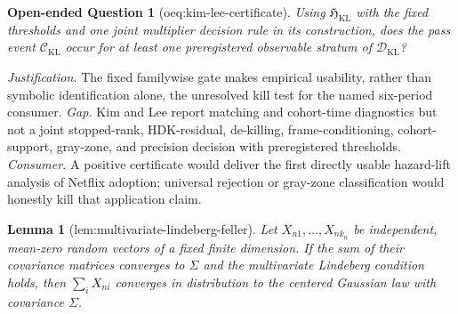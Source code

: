 \documentclass{article}
\newtheorem{lemma}{Lemma}
\newtheorem{openendedquestion}{Open-ended Question}
\begin{document}
\begin{openendedquestion}[oeq:kim-lee-certificate]\label{oeq:kim-lee-certificate}
Using \(\mathfrak H_{\mathrm{KL}}\) with the fixed thresholds and one joint multiplier decision rule in its construction, does the pass event \(\mathcal C_{\mathrm{KL}}\) occur for at least one preregistered observable stratum of \(\mathscr D_{\mathrm{KL}}\)?
\end{openendedquestion}
\par\smallskip\noindent \textit{Justification.} The fixed familywise gate makes empirical usability, rather than symbolic identification alone, the unresolved kill test for the named six-period consumer. \textit{Gap.} Kim and Lee report matching and cohort-time diagnostics but not a joint stopped-rank, HDK-residual, de-killing, frame-conditioning, cohort-support, gray-zone, and precision decision with preregistered thresholds. \textit{Consumer.} A positive certificate would deliver the first directly usable hazard-lift analysis of Netflix adoption; universal rejection or gray-zone classification would honestly kill that application claim.

\begin{lemma}[lem:multivariate-lindeberg-feller]\label{lem:multivariate-lindeberg-feller}
Let \(X_{n1},\ldots,X_{nk_n}\) be independent, mean-zero random vectors of a fixed finite dimension.  If the sum of their covariance matrices converges to \(\Sigma\) and the multivariate Lindeberg condition holds, then \(\sum_iX_{ni}\) converges in distribution to the centered Gaussian law with covariance \(\Sigma\).
\end{lemma}
\end{document}
